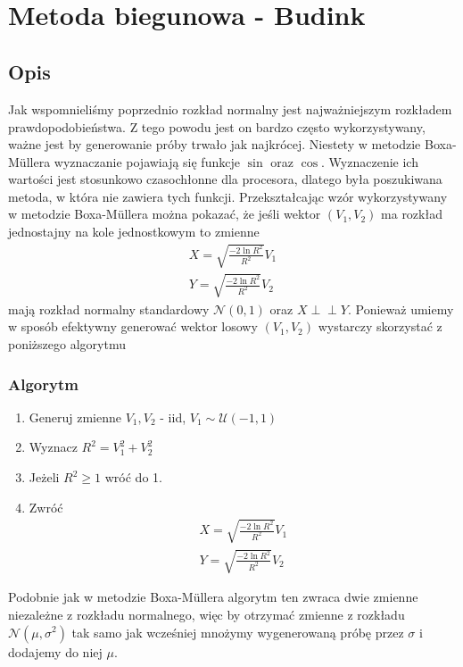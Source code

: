 \documentclass[12pt]{mwrep}
\newcommand{\indep}{\perp \!\!\! \perp}
\begin{document}
	
	
	\section{Metoda biegunowa\textsuperscript{\cite{polar}} - Budink}
	\subsection{Opis}
	\noindent Jak wspomnieliśmy poprzednio rozkład normalny jest najważniejszym rozkładem prawdopodobieństwa. Z tego powodu jest on bardzo często wykorzystywany, ważne jest by generowanie próby trwało jak najkrócej. Niestety w metodzie Boxa-M{\"u}llera wyznaczanie pojawiają się funkcje $\sin$ oraz $\cos$. Wyznaczenie ich wartości jest stosunkowo czasochłonne dla procesora, dlatego była poszukiwana metoda, w która nie zawiera tych funkcji. Przekształcając wzór wykorzystywany w metodzie Boxa-M\"ullera można pokazać, że jeśli wektor $(V_1, V_2)$ ma rozkład jednostajny na kole jednostkowym to zmienne
	\begin{equation}
		\begin{split}
			X=\sqrt{\frac{-2\ln R^2}{R^2}}V_1\\
			Y=\sqrt{\frac{-2\ln R^2}{R^2}}V_2
		\end{split}
	\end{equation}
	mają rozkład normalny standardowy $\mathcal{N}(0,1)$ oraz $X \indep Y$. Ponieważ umiemy w sposób efektywny generować wektor losowy $(V_1, V_2)$ wystarczy skorzystać z poniższego algorytmu
	\subsubsection{Algorytm}
	\begin{enumerate}[leftmargin=10mm]
		\item Generuj zmienne $V_1, V_2$ - iid, $V_1\sim\mathcal{U}(-1,1)$
		\item Wyznacz $R^2=V_1^2+V_2^2$
		\item Jeżeli $R^2\ge 1$ wróć do 1.
		\item Zwróć
		\begin{equation}
			\begin{split}
				X=\sqrt{\frac{-2\ln R^2}{R^2}}V_1\\
				Y=\sqrt{\frac{-2\ln R^2}{R^2}}V_2
			\end{split}
		\end{equation}
	\end{enumerate}
	Podobnie jak w metodzie Boxa-M{\"u}llera algorytm ten zwraca dwie zmienne niezależne z rozkładu normalnego, więc by otrzymać zmienne z rozkładu $\mathcal{N}(\mu,\sigma^2)$ tak samo jak wcześniej mnożymy wygenerowaną próbę przez $\sigma$ i dodajemy do niej $\mu$.
	
\end{document}
